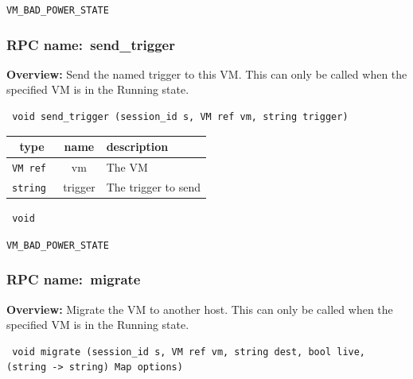 \vspace{0.3cm}

 {\tt VM\_BAD\_POWER\_STATE}

\vspace{0.6cm}
\subsubsection{RPC name:~send\_trigger}

{\bf Overview:} 
Send the named trigger to this VM.  This can only be called when the
specified VM is in the Running state.

\begin{verbatim} void send_trigger (session_id s, VM ref vm, string trigger)\end{verbatim}



 
\vspace{0.3cm}
\begin{tabular}{|c|c|p{7cm}|}
 \hline
{\bf type} & {\bf name} & {\bf description} \\ \hline
{\tt VM ref } & vm & The VM \\ \hline 

{\tt string } & trigger & The trigger to send \\ \hline 

\end{tabular}

\vspace{0.3cm}

{\tt 
void
}



\vspace{0.3cm}

 {\tt VM\_BAD\_POWER\_STATE}

\vspace{0.6cm}
\subsubsection{RPC name:~migrate}

{\bf Overview:} 
Migrate the VM to another host.  This can only be called when the specified
VM is in the Running state.

\begin{verbatim} void migrate (session_id s, VM ref vm, string dest, bool live, (string -> string) Map options)\end{verbatim}


